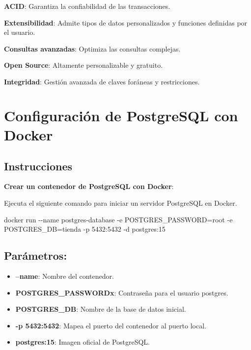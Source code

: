 \documentclass[
  a4paper,
  DIV=11,
  numbers=noendperiod,
  onepage,
  openany]{scrreprt}
\newenvironment{Shaded}{\begin{snugshade}}{\end{snugshade}}
\newcommand{\AttributeTok}[1]{\textcolor[rgb]{0.40,0.45,0.13}{#1}}
\newcommand{\ExtensionTok}[1]{\textcolor[rgb]{0.00,0.23,0.31}{#1}}
\newcommand{\NormalTok}[1]{\textcolor[rgb]{0.00,0.23,0.31}{#1}}
\providecommand{\tightlist}{%
  \setlength{\itemsep}{0pt}\setlength{\parskip}{0pt}}\usepackage{longtable,booktabs,array}
\begin{document}
\textbf{ACID}: Garantiza la confiabilidad de las transacciones.

\textbf{Extensibilidad}: Admite tipos de datos personalizados y
funciones definidas por el usuario.

\textbf{Consultas avanzadas}: Optimiza las consultas complejas.

\textbf{Open Source}: Altamente personalizable y gratuito.

\textbf{Integridad}: Gestión avanzada de claves foráneas y
restricciones.

\section{Configuración de PostgreSQL con
Docker}\label{configuraciuxf3n-de-postgresql-con-docker}

\subsection{Instrucciones}\label{instrucciones-8}

\textbf{Crear un contenedor de PostgreSQL con Docker}:

Ejecuta el siguiente comando para iniciar un servidor PostgreSQL en
Docker.

\begin{Shaded}
\begin{Highlighting}[]
\ExtensionTok{docker}\NormalTok{ run }\AttributeTok{{-}{-}name}\NormalTok{ postgres{-}database }\AttributeTok{{-}e}\NormalTok{ POSTGRES\_PASSWORD=root }\AttributeTok{{-}e}\NormalTok{ POSTGRES\_DB=tienda }\AttributeTok{{-}p}\NormalTok{ 5432:5432 }\AttributeTok{{-}d}\NormalTok{ postgres:15}
\end{Highlighting}
\end{Shaded}

\subsection{Parámetros:}\label{paruxe1metros-1}

\begin{itemize}
\tightlist
\item
  \textbf{--name}: Nombre del contenedor.
\item
  \textbf{POSTGRES\_PASSWORDx}: Contraseña para el usuario postgres.
\item
  \textbf{POSTGRES\_DB}: Nombre de la base de datos inicial.
\item
  \textbf{-p 5432:5432}: Mapea el puerto del contenedor al puerto local.
\item
  \textbf{postgres:15}: Imagen oficial de PostgreSQL.
\end{itemize}
\end{document}

